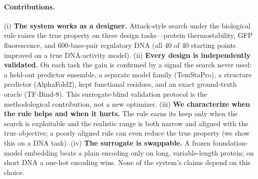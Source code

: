 \documentclass{article}
\begin{document}
\paragraph{Contributions.}
(i) \textbf{The system works as a designer.} Attack-style search under the biological rule
raises the true property on three design tasks---protein thermostability, GFP fluorescence,
and 600-base-pair regulatory DNA (all 40 of 40 starting points improved on a true DNA-activity
model). (ii) \textbf{Every design is independently validated.} On each task the gain is
confirmed by a signal the search never used: a held-out predictor ensemble, a separate
model family (TemStaPro), a structure predictor (AlphaFold2), kept functional residues, and
an exact ground-truth oracle (TF-Bind-8). This surrogate-blind validation protocol is the
methodological contribution, not a new optimizer. (iii) \textbf{We characterize when the
rule helps and when it hurts.} The rule earns its keep only when the search is exploitable
and the realistic range is both narrow and aligned with the true objective; a poorly aligned
rule can even reduce the true property (we show this on a DNA task). (iv) \textbf{The
surrogate is swappable.} A frozen foundation-model embedding beats a plain encoding only on
long, variable-length protein; on short DNA a one-hot encoding wins. None of the system's
claims depend on this choice.
\end{document}
